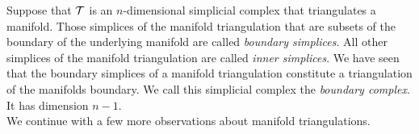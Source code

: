 \documentclass[12pt,a4paper]{article}
\begin{document}
Suppose that ${\mathcal T}$ is an $n$-dimensional simplicial complex that triangulates a manifold. 
Those simplices of the manifold triangulation that are subsets of the boundary of the underlying manifold are called \emph{boundary simplices}. 
All other simplices of the manifold triangulation are called \emph{inner simplices}. 
We have seen that the boundary simplices of a manifold triangulation constitute a triangulation of the manifolds boundary. 
We call this simplicial complex the \emph{boundary complex}. It has dimension $n-1$. 
\\

We continue with a few more observations about manifold triangulations.
\end{document}
